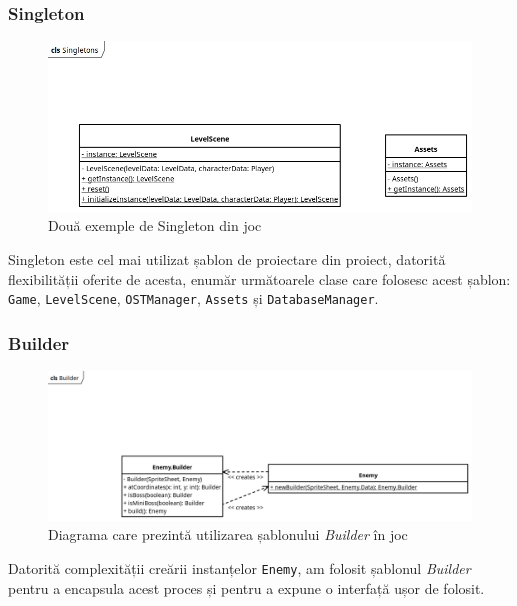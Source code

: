 \documentclass{article}
\begin{document}
    \subsubsection{Singleton}
    \begin{figure}[H]
        \includegraphics[width=\textwidth]{singletons-diagram}
        \centering
        \caption{Două exemple de Singleton din joc}
    \end{figure}

    Singleton este cel mai utilizat șablon de proiectare din proiect, datorită flexibilității
    oferite de acesta, enumăr următoarele clase care folosesc acest șablon: \texttt{Game},
    \texttt{LevelScene}, \texttt{OSTManager}, \texttt{Assets} și \texttt{DatabaseManager}.

    \subsubsection{Builder}
    \begin{figure}[H]
        \includegraphics[width=\textwidth]{builder-diagram}
        \centering
        \caption{Diagrama care prezintă utilizarea șablonului \emph{Builder} în joc}
    \end{figure}

    Datorită complexității creării instanțelor \texttt{Enemy}, am folosit șablonul \emph{Builder}
    pentru a encapsula acest proces și pentru a expune o interfață ușor de folosit.
\end{document}
